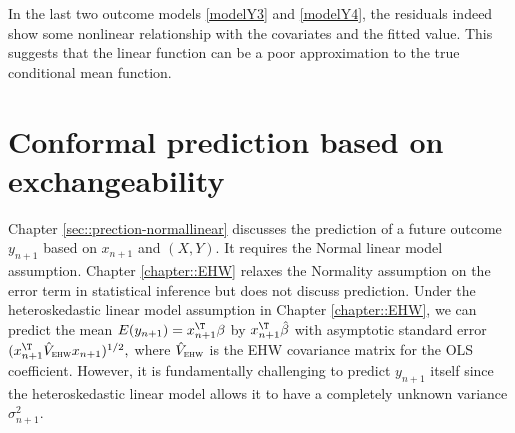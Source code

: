 In the last two outcome models \eqref{modelY3} and \eqref{modelY4}, the residuals indeed show some nonlinear relationship with the covariates and the fitted value. This suggests that the linear function can be a poor approximation to the true conditional mean function. 



\section{Conformal prediction based on exchangeability}\label{sec::conformal-prediction}


Chapter \ref{sec::prection-normallinear} discusses the prediction of a future outcome $y_{n+1}$ based on $x_{n+1}$ and $(X,Y)$. It requires the Normal linear model assumption. Chapter \ref{chapter::EHW} relaxes the Normality assumption on the error term in statistical inference but does not discuss prediction. Under the heteroskedastic linear model assumption in Chapter \ref{chapter::EHW}, we can predict the mean $E(y_{n+1}) = x_{n+1}^{\T} \beta$ by $x_{n+1}^{\T} \hat\beta$ with asymptotic standard error
$
( x_{n+1}^{\T}  \hat{V}_{\textsc{ehw}}  x_{n+1} )^{1/2},
$
where $ \hat{V}_{\textsc{ehw}}$ is the EHW covariance matrix for the OLS coefficient. However, it is fundamentally challenging to predict $y_{n+1}$ itself since the heteroskedastic linear model allows it to have a completely unknown variance $\sigma^2_{n+1}$. 



